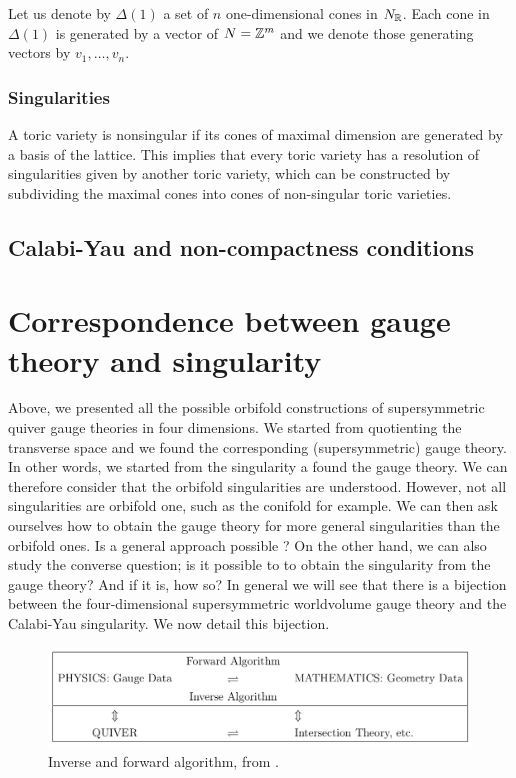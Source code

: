             Let us denote by $\Delta(1)$ a set of $n$ one-dimensional cones in $N_{\mathbb{R}}$. Each cone in $\Delta(1)$ is generated by a vector of $N=\mathbb{Z}^m$ and we denote those generating vectors by $v_1,\dots,v_n$.

        \subsubsection{Singularities}

            A toric variety is nonsingular if its cones of maximal dimension are generated by a basis of the lattice. This implies that every toric variety has a resolution of singularities given by another toric variety, which can be constructed by subdividing the maximal cones into cones of non-singular toric varieties.

        

    \subsection{Calabi-Yau and non-compactness conditions}

\section{Correspondence between gauge theory and singularity}

    Above, we presented all the possible orbifold constructions of supersymmetric quiver gauge theories in four dimensions. We started from quotienting the transverse space and we found the corresponding (supersymmetric) gauge theory. In other words, we started from the singularity a found the gauge theory. We can therefore consider that the orbifold singularities are understood. However, not all singularities are orbifold one, such as the conifold for example. We can then ask ourselves how to obtain the gauge theory for more general singularities than the orbifold ones. Is a general approach possible ? On the other hand, we can also study the converse question; is it possible to to obtain the singularity from the gauge theory? And if it is, how so? In general we will see that there is a bijection between the four-dimensional supersymmetric worldvolume gauge theory and the Calabi-Yau singularity. We now detail this bijection.

    \begin{figure}[H]
        \centering
        \includegraphics[scale=0.3]{Pictures/algorithm.png}
        \caption{Inverse and forward algorithm, from \cite{he2004lectures}.}
    \end{figure}

